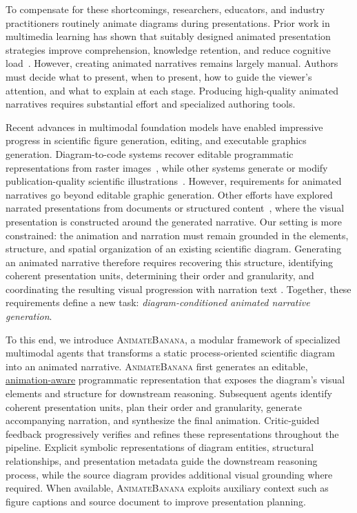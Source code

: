 \documentclass{article} %
\begin{document}
To compensate for these shortcomings, researchers, educators, and industry practitioners routinely animate diagrams during presentations. Prior work in multimedia learning has shown that suitably designed animated presentation strategies improve comprehension, knowledge retention, and reduce cognitive load~\citep{mayer2003cognitiveload,rey2019segmenting,xie2017cueingmeta,
schneider2023whiteboard}. However, creating animated narratives remains largely manual. Authors must decide what to present, when to present, how to guide the viewer's attention, and what to explain at each stage. Producing high-quality animated narratives  requires substantial effort and specialized authoring tools.

Recent advances in multimodal foundation models have enabled impressive progress in scientific figure generation, editing, and executable graphics generation. Diagram-to-code systems recover editable programmatic representations from raster images~\citep{starvector,detikzify}, while other systems generate or modify publication-quality scientific illustrations~\citep{paperbanana,figagent,autofigure,livefigure}. However, requirements for animated narratives go beyond  editable graphic generation. Other efforts have explored narrated presentations from documents or structured content~\citep{shi-etal-2025-presentagent,code2video}, where the visual presentation is constructed around the generated narrative. Our setting is more constrained: the animation and narration must remain grounded in the elements, structure, and spatial organization of an existing scientific diagram. Generating an animated narrative therefore requires recovering this structure, identifying coherent presentation units, determining their order and granularity, and coordinating the resulting visual progression with narration text . Together, these requirements define a new task: \emph{diagram-conditioned animated narrative generation}.

To this end, we introduce \textsc{AnimateBanana}, a modular framework of specialized multimodal agents that transforms a static process-oriented scientific diagram into an animated narrative. \textsc{AnimateBanana} first generates an editable, \underline{animation-aware} programmatic representation that exposes the diagram's visual elements and structure for downstream reasoning. Subsequent agents identify coherent presentation units, plan their order and granularity, generate accompanying narration, and synthesize the final animation. Critic-guided feedback progressively verifies and refines these representations throughout the pipeline. 
Explicit symbolic representations of diagram entities, structural relationships, and presentation metadata guide the downstream reasoning process, while the source diagram provides
additional visual grounding where required. When available, \textsc{AnimateBanana} exploits auxiliary context such as figure captions and source document to improve presentation planning. 
\end{document}
